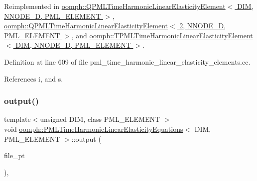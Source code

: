 Reimplemented in \hyperlink{classoomph_1_1QPMLTimeHarmonicLinearElasticityElement_a6cb8fd016cd38ff92b4152ebf3ca00d1}{oomph\+::\+Q\+P\+M\+L\+Time\+Harmonic\+Linear\+Elasticity\+Element$<$ D\+I\+M, N\+N\+O\+D\+E\+\_\+D, P\+M\+L\+\_\+\+E\+L\+E\+M\+E\+N\+T $>$}, \hyperlink{classoomph_1_1QPMLTimeHarmonicLinearElasticityElement_a6cb8fd016cd38ff92b4152ebf3ca00d1}{oomph\+::\+Q\+P\+M\+L\+Time\+Harmonic\+Linear\+Elasticity\+Element$<$ 2, N\+N\+O\+D\+E\+\_\+D, P\+M\+L\+\_\+\+E\+L\+E\+M\+E\+N\+T $>$}, and \hyperlink{classoomph_1_1TPMLTimeHarmonicLinearElasticityElement_ac28193016db74abe10b78b871ba7b74a}{oomph\+::\+T\+P\+M\+L\+Time\+Harmonic\+Linear\+Elasticity\+Element$<$ D\+I\+M, N\+N\+O\+D\+E\+\_\+D, P\+M\+L\+\_\+\+E\+L\+E\+M\+E\+N\+T $>$}.



Definition at line 609 of file pml\+\_\+time\+\_\+harmonic\+\_\+linear\+\_\+elasticity\+\_\+elements.\+cc.



References i, and s.

\mbox{\label{classoomph_1_1PMLTimeHarmonicLinearElasticityEquations_a4f333b308aa6bfd8e70a458574ed47fe}} 
\subsubsection{\texorpdfstring{output()}{output()}\hspace{0.1cm}{\footnotesize\ttfamily [3/4]}}
{\footnotesize\ttfamily template$<$unsigned D\+IM, class P\+M\+L\+\_\+\+E\+L\+E\+M\+E\+NT $>$ \\
void \hyperlink{classoomph_1_1PMLTimeHarmonicLinearElasticityEquations}{oomph\+::\+P\+M\+L\+Time\+Harmonic\+Linear\+Elasticity\+Equations}$<$ D\+IM, P\+M\+L\+\_\+\+E\+L\+E\+M\+E\+NT $>$\+::output (\begin{DoxyParamCaption}\item[{F\+I\+LE $\ast$}]{file\+\_\+pt }\end{DoxyParamCaption})\hspace{0.3cm}{\ttfamily [inline]}, {\ttfamily [virtual]}}



